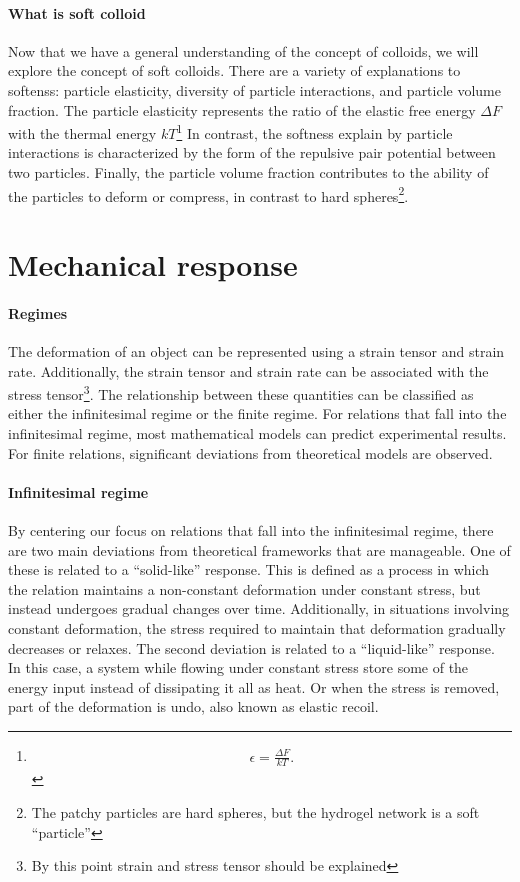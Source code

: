 \paragraph{What is soft colloid} Now that we have a general understanding of the concept of colloids, we will explore the concept of soft colloids.
There are a variety of explanations to softenss: particle elasticity, diversity of particle interactions, and particle volume fraction.
The particle elasticity represents the ratio of the elastic free energy $\Delta F$ with the thermal energy $kT$\footnote{
\begin{gather}
    \epsilon = \frac{\Delta F}{kT}.
\end{gather}
}
In contrast, the softness explain by particle interactions is characterized by the form of the repulsive pair potential between two particles.
Finally, the particle volume fraction contributes to the ability of the particles to deform or compress, in contrast to hard spheres\footnote{The patchy particles are hard spheres, but the hydrogel network is a soft ``particle''}\citep{vlassopoulosTunableRheologyDense2014}.


\section{Mechanical response}


\paragraph{Regimes} The deformation of an object can be represented using a strain tensor and strain rate.
Additionally, the strain tensor and strain rate can be associated with the stress tensor\footnote{By this point strain and stress tensor should be explained}. 
The relationship between these quantities can be classified as either the infinitesimal regime or the finite regime.
For relations that fall into the infinitesimal regime, most mathematical models can predict experimental results.
For finite relations, significant deviations from theoretical models are observed.

\paragraph{Infinitesimal regime} By centering our focus on relations that fall into the infinitesimal regime, there are two main deviations from theoretical frameworks that are manageable.
One of these is related to a ``solid-like'' response.
This is defined as a process in which the relation maintains a non-constant deformation under constant stress, but instead undergoes gradual changes over time.
Additionally, in situations involving constant deformation, the stress required to maintain that deformation gradually decreases or relaxes.
The second deviation is related to a ``liquid-like'' response.
In this case, a system while flowing under constant stress store some of the energy input instead of dissipating it all as heat.
Or when the stress is removed, part of the deformation is undo, also known as elastic recoil.

